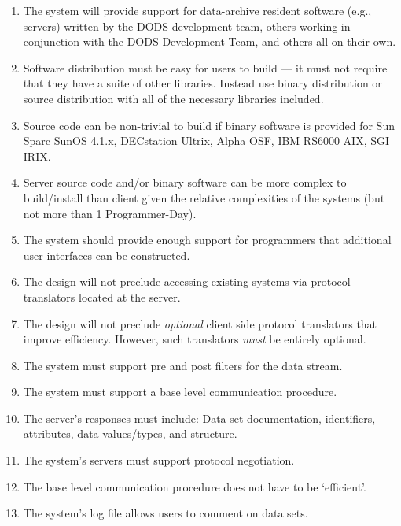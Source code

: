 \begin{enumerate}
\item The system will provide support for data-archive resident software (e.g.,
servers) written by the DODS development team, others working in conjunction
with the DODS Development Team, and others all on their own.

\item Software distribution must be easy for users to build --- it must not
require that they have a suite of other libraries. Instead use binary
distribution or source distribution with all of the necessary libraries
included.

\item Source code can be non-trivial to build if binary software is provided
for Sun Sparc SunOS 4.1.x, DECstation Ultrix, Alpha OSF, IBM RS6000 AIX, SGI
IRIX.

\item Server source code and/or binary software can be more complex to
build/install than client given the relative complexities of the systems (but
not more than 1 Programmer-Day).

\item The system should provide enough support for programmers that additional
user interfaces can be constructed.

\item The design will not preclude accessing existing systems via protocol
translators located at the server.

\item The design will not preclude {\em optional\/} client side protocol
translators that improve efficiency. However, such translators {\em must\/} be
entirely optional. 

\item The system must support pre and post filters for the data stream.

\item The system must support a base level communication procedure.

\item The server's responses must include: Data set documentation, identifiers,
attributes, data values/types, and structure.

\item The system's servers must support protocol negotiation.

\item The base level communication procedure does not have to be `efficient'.

\item The system's log file allows users to comment on data sets.


\end{enumerate}
